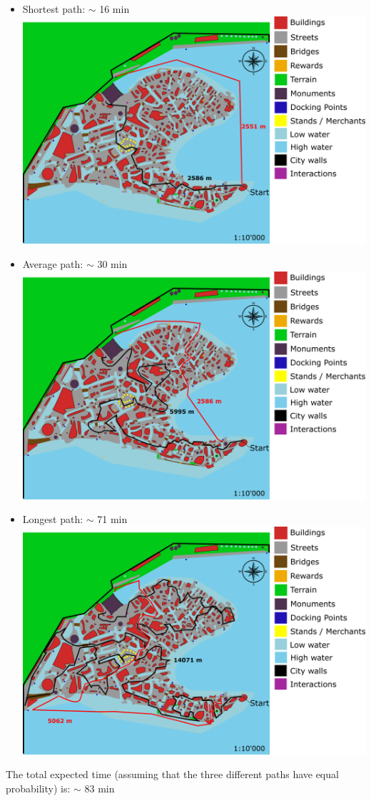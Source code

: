 \begin{itemize}
\item Shortest path: $\sim$ 16 min \\
\includegraphics[scale=0.3]{Images/Diagrams/dynamiapath1.png}
\item Average path: $\sim$ 30 min \\
\includegraphics[scale=0.3]{Images/Diagrams/dynamiapath2.png}
\item Longest path: $\sim$ 71 min \\
\includegraphics[scale=0.3]{Images/Diagrams/dynamiapath3.png}
\end{itemize}

The total expected time (assuming that the three different paths have equal probability) is:  $\sim$ 83 min